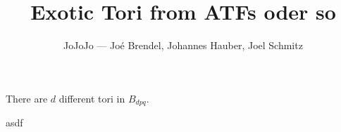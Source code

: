 \documentclass[11pt,a4paper,draft]{scrartcl}
\begin{document}
\title{Exotic Tori from ATFs oder so}
\author{JoJoJo — Joé Brendel, Johannes Hauber, Joel Schmitz}

\maketitle

\begin{theorem}
There are $d$ different tori in $B_{dpq}$.
\end{theorem}

asdf
\end{document}
